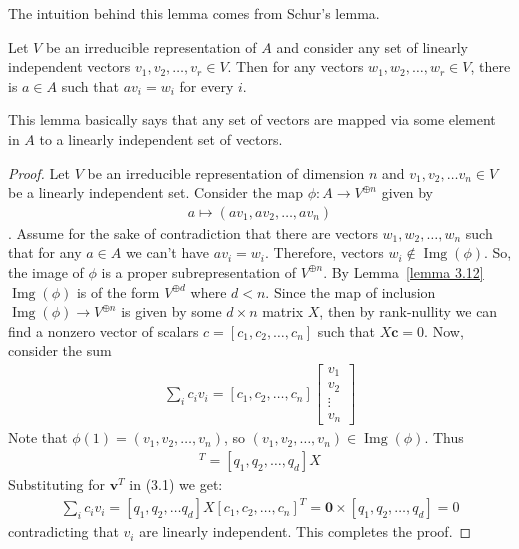  The intuition behind this lemma comes from Schur's lemma. 
   \begin{lemma}
    \label{lemma 3.13}
     Let $V$ be an irreducible representation of $A$ and consider any set of linearly independent vectors $v_1,v_2, \dots , v_r \in V$. 
     Then for any vectors $w_1, w_2, \dots, w_r \in V$, there is $a \in A$ such that $av_i = w_i$ for every $i$.

   \end{lemma}
   This lemma basically says that any set of vectors are mapped via some element in $A$ to a linearly independent set of vectors.
   \begin{proof}
   Let $V$ be an irreducible representation of dimension $n$ and $v_1, v_2, \dots v_n \in V$ be a linearly independent set. Consider the map $\phi: A \to V^{\oplus n}$ given by
   \begin{align*}
    a \mapsto (av_1, av_2, \dots, av_n)
   \end{align*} 
   . Assume for the sake of contradiction that there are vectors $w_1,w_2, \dots, w_n$ such that for any $a \in A$ we can't have $av_i = w_i$. Therefore, vectors $w_i \not \in \operatorname{Img}(\phi)$. So, the image of $\phi$ is a proper subrepresentation of $V^{\oplus n}$. By Lemma~\ref{lemma 3.12} $\operatorname{Img}(\phi) $ is of the form $V^{\oplus d}$ where $d < n$. 
   Since the map of inclusion $\operatorname{Img}(\phi) \to V^{\oplus n}$ is given by some $d \times n$ matrix $X$, then by rank-nullity we can find a nonzero vector of scalars $c = [c_1,c_2, \dots ,c_n]$ such that $X\textbf{c} = 0$. Now, consider the sum 
   \begin{align}
   \sum_i c_iv_i = [c_1, c_2, \dots, c_n] \begin{bmatrix}
    v_1 \\ v_2 \\ \vdots \\ v_n 
   \end{bmatrix}
   \end{align}
 Note that $\phi(1) = (v_1,v_2, \dots , v_n)$, so $(v_1,v_2, \dots, v_n) \in \operatorname{Img}(\phi)$. Thus \begin{align*}
 [v_1,v_2 , \dots, v_n]^T =[q_1,q_2, \dots, q_d] X
 \end{align*} Substituting for $\textbf{v}^T$ in (3.1) we get:
 \begin{align*}
  \sum_i c_iv_i =  [q_1,q_2, \dots q_d] X [c_1, c_2, \dots, c_n]^T = \boldsymbol{0}\times [q_1,q_2, \dots, q_d] = 0
 \end{align*}
 contradicting that $v_i$ are linearly independent. This completes the proof.
\end{proof}
